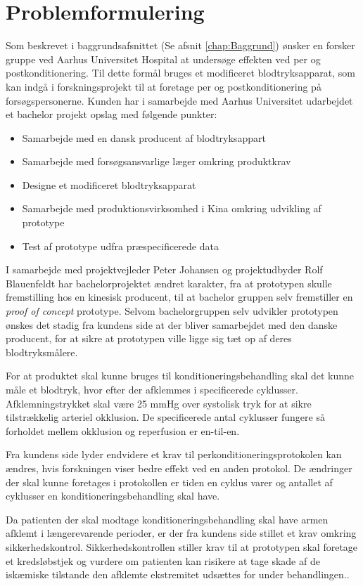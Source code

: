 \chapter{Problemformulering}\label{title:problemformulering}
Som beskrevet i baggrundsafsnittet (Se afsnit \ref{chap:Baggrund}) ønsker en forsker gruppe ved Aarhus Universitet Hospital at undersøge effekten ved per og postkonditionering. Til dette formål bruges et modificeret blodtryksapparat, som kan indgå i forskningsprojekt til at foretage per og postkonditionering på forsøgspersonerne. Kunden har i samarbejde med Aarhus Universitet udarbejdet et bachelor projekt opslag med følgende punkter:
\begin{itemize}
	\item Samarbejde med en dansk producent af blodtryksappart
	\item Samarbejde med forsøgsansvarlige læger omkring produktkrav
	\item Designe et modificeret blodtryksapparat
	\item Samarbejde med produktionsvirksomhed i Kina omkring udvikling af prototype 
	\item Test af prototype udfra præspecificerede data
\end{itemize}

I samarbejde med projektvejleder Peter Johansen og projektudbyder Rolf Blauenfeldt har bachelorprojektet ændret karakter, fra at prototypen skulle fremstilling hos en kinesisk producent, til at bachelor gruppen selv fremstiller en \textit{proof of concept} prototype. Selvom bachelorgruppen selv udvikler prototypen ønskes det stadig fra kundens side at der bliver samarbejdet med den danske producent, for at sikre at prototypen ville ligge sig tæt op af deres blodtryksmålere.

For at produktet skal kunne bruges til konditioneringsbehandling skal det kunne måle et blodtryk, hvor efter der afklemmes i specificerede cyklusser. Afklemningstrykket skal være 25 mmHg over systolisk tryk for at sikre tilstrækkelig arteriel okklusion. De specificerede antal cyklusser fungere så forholdet mellem okklusion og reperfusion er en-til-en. 

Fra kundens side lyder endvidere et krav til perkonditioneringsprotokolen kan ændres, hvis forskningen viser bedre effekt ved en anden protokol. De ændringer der skal kunne foretages i protokollen er tiden en cyklus varer og antallet af cyklusser en konditioneringsbehandling skal have. 

Da patienten der skal modtage konditioneringsbehandling skal have armen afklemt i længerevarende perioder, er der fra kundens side stillet et krav omkring sikkerhedskontrol. Sikkerhedskontrollen stiller krav til at prototypen skal foretage et kredsløbstjek og vurdere om patienten kan risikere at tage skade af de iskæmiske tilstande den afklemte ekstremitet udsættes for under behandlingen..

